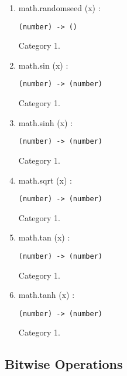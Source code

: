 \documentclass{paper}
\begin{document}
\begin{enumerate}
\begin{verbatim}
\end{verbatim}
\item math.randomseed (x) :
\begin{verbatim}
(number) -> ()
\end{verbatim}
Category 1.
\item math.sin (x) :
\begin{verbatim}
(number) -> (number)
\end{verbatim}
Category 1.
\item math.sinh (x) :
\begin{verbatim}
(number) -> (number)
\end{verbatim}
Category 1.
\item math.sqrt (x) :
\begin{verbatim}
(number) -> (number)
\end{verbatim}
Category 1.
\item math.tan (x) :
\begin{verbatim}
(number) -> (number)
\end{verbatim}
Category 1.
\item math.tanh (x) :
\begin{verbatim}
(number) -> (number)
\end{verbatim}
Category 1.
\end{enumerate}

\subsection{Bitwise Operations}
\end{document}
